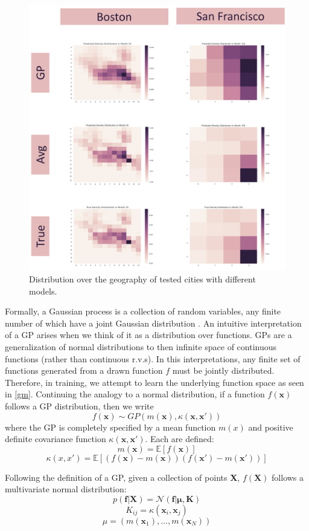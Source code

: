 \documentclass[letterpaper, 11 pt, conference]{ieeeconf}  %
\newcommand{\bx}{\textbf{x}}
\newcommand{\bX}{\textbf{X}}
\newcommand{\bK}{\textbf{K}}
\begin{document}
\begin{figure}
\centering
\includegraphics[scale=0.15]{heat_maps}
\caption{Distribution over the geography of tested cities with different models.}
\end{figure}
Formally, a Gaussian process is a collection of random variables, any finite number of which have a joint Gaussian distribution \cite{c1}. An intuitive interpretation of a GP arises when we think of it as a distribution over functions. GPs are a generalization of normal distributions to then infinite space of continuous functions (rather than continuous r.v.s). In this interpretations, any finite set of functions generated from a drawn function $f$ must be jointly distributed. Therefore, in training, we attempt to learn the underlying function space as seen in \ref{gm}. Continuing the analogy to a normal distribution, if a function $f(\bx)$ follows a GP distribution, then we write  
$$f(\bx) \sim GP(m(\bx), \kappa(\bx, \bx'))$$
where the GP is completely specified by a mean function $m(x)$ and positive definite covariance function $\kappa(\bx, \bx')$. Each are defined:
$$m(\bx) = \mathbb{E}[f(\bx)]$$
$$\kappa(x, x') = \mathbb{E}[(f(\bx) - m(\bx))(f(\bx') - m(\bx'))]$$

Following the definition of a GP, given a collection of points \bX, $f(\bX)$ follows a multivariate normal distribution:
$$p(\textbf{f}|\bX) = \mathcal{N}(\textbf{f}|\bm{\mu}, \bK)$$
$$K_{ij} = \kappa(\bx_i, \bx_j)$$
$$\mu = (m(\bx_1), \dots, m(\bx_N))$$
\end{document}
